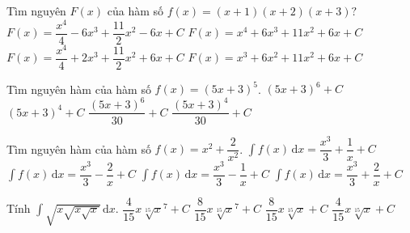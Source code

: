 \begin{ex}%
	Tìm nguyên $F(x)$ của hàm số $f(x)=(x+1)(x+2)(x+3)?$
	\choice
	{$F(x)=\dfrac{x^4}{4}-6x^3+\dfrac{11}{2}x^2-6x+C$}
	{$F(x)=x^4+6x^3+11x^2+6x+C$}
	{\True $F(x)=\dfrac{x^4}{4}+2x^3+\dfrac{11}{2}x^2+6x+C$}
	{$F(x)=x^3+6x^2+11x^2+6x+C$}
\end{ex}

\begin{ex}%
	Tìm nguyên hàm của hàm số $f(x)=(5x+3)^5$.
	\choice
	{$(5x+3)^6+C$}
	{$(5x+3)^4+C$}
	{\True $\dfrac{(5x+3)^6}{30}+C$}
	{$\dfrac{(5x+3)^4}{30}+C$}
\end{ex}

\begin{ex}%
	Tìm nguyên hàm của hàm số $f(x)=x^2+\dfrac{2}{x^2}$.
	\choice
	{\True $\displaystyle\int{f(x)\mathrm{\,d}x}=\dfrac{x^3}{3}+\dfrac{1}{x}+C$}
	{$\displaystyle\int{f(x)\mathrm{\,d}x}=\dfrac{x^3}{3}-\dfrac{2}{x}+C$}
	{$\displaystyle\int{f(x)\mathrm{\,d}x}=\dfrac{x^3}{3}-\dfrac{1}{x}+C$}
	{$\displaystyle\int{f(x)\mathrm{\,d}x}=\dfrac{x^3}{3}+\dfrac{2}{x}+C$}
\end{ex}

\begin{ex}%
	Tính $\displaystyle\int{\sqrt{x\sqrt{x\sqrt{x}}}\mathrm{\,d}x}$.
	\choice
	{$\dfrac{4}{15}x\sqrt[15]x^7+C$}
	{\True $\dfrac{8}{15}x\sqrt[15]x^7+C$}
	{$\dfrac{8}{15}x\sqrt[15]x+C$}
	{$\dfrac{4}{15}x\sqrt[15]x+C$}
\end{ex}

